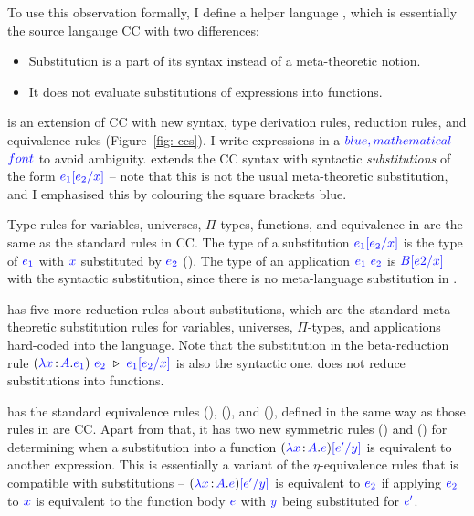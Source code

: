 To use this observation formally, I define a helper language {\ccs}, which is essentially the source langauge CC with two differences:
\begin{itemize}
	\item Substitution is a part of its syntax instead of a meta-theoretic notion.
	\item It does not evaluate substitutions of expressions into functions.
\end{itemize}

{\ccs} is an extension of CC with new syntax, type derivation rules, reduction rules, and equivalence rules (Figure~\ref{fig: ccs}). I write {\ccs} expressions in a $\helper{blue, mathematical}$ $\helper{font}$ to avoid ambiguity. {\ccs} extends the CC syntax with syntactic \textit{substitutions} of the form $\helper{e_1\sub{e_2}{x}}$ -- note that this is not the usual meta-theoretic substitution, and I emphasised this by colouring the square brackets blue. 

Type rules for variables, universes, $\Pi$-types, functions, and equivalence in {\ccs} are the same as the standard rules in CC.
The type of a substitution $\helper{e_1\sub{e_2}{x}}$ is the type of $\helper{e_1}$ with $\helper{x}$ substituted by $\helper{e_2}$ (). The type of an application $\helper{e_1} \ \helper{e_2}$ is $\helper{B\sub{e2}{x}}$ with the syntactic substitution, since there is no meta-language substitution in {\ccs}.

{\ccs} has five more reduction rules about substitutions, which are the standard meta-theoretic substitution rules for variables, universes, $\Pi$-types, and applications hard-coded into the language. Note that the substitution in the beta-reduction rule $(\helper{\lambda x} \goodcolon \helper{A} . \helper{e_1})\ \helper{e_2}\ \triangleright\ \helper{e_1\sub{e_2}{x}}$ is also the syntactic one. {\ccs} does not reduce substitutions into functions.

{\ccs} has the standard equivalence rules (), (), and (), defined in the same way as those rules in are CC. Apart from that, it has two new symmetric rules () and () for determining when a substitution into a function 
$(\helper{\lambda x} \goodcolon \helper{A} . \helper{e})\helper{\sub{e'}{y}}$ 
is equivalent to another expression. This is essentially a variant of the $\eta$-equivalence rules that is compatible with substitutions -- $(\helper{\lambda x} \goodcolon \helper{A} . \helper{e})\helper{\sub{e'}{y}}$ is equivalent to $\helper{e_2}$ if applying $\helper{e_2}$ to $\helper{x}$ is equivalent to the function body $\helper{e}$ with $\helper{y}$ being substituted for $\helper{e'}$.

